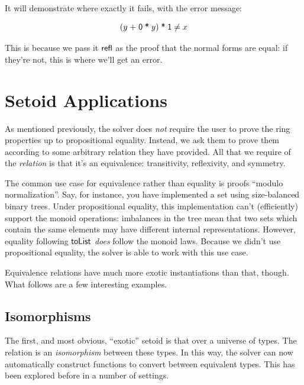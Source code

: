 \documentclass[draft, twocolumn]{article}
\theoremstyle{definition}
\theoremstyle{definition}
\begin{document}

It will demonstrate where exactly it fails, with the error message:

\[
 (y \; \AgdaFunction{+} \; \AgdaNumber{0} \; \AgdaFunction{*} \; y) \;
 \AgdaFunction{*} \;
 \AgdaNumber{1} \neq x
\]

This is because we pass it \(\AgdaField{refl}\) as the proof that the normal
forms are equal: if they're not, this is where we'll get an error.

\section{Setoid Applications} \label{equivalence}
As mentioned previously, the solver does \emph{not} require the user to prove
the ring properties up to propositional equality. Instead, we ask them to prove
them according to some arbitrary relation they have provided. All that we
require of the \emph{relation} is that it's an equivalence: transitivity,
reflexivity, and symmetry.

The common use case for equivalence rather than equality is proofs ``modulo
normalization''. Say, for instance, you have implemented a set using
size-balanced binary trees. Under propositional equality, this implementation
can't (efficiently) support the monoid operations: imbalances in the tree mean
that two sets which contain the same elements may have different internal
representations. However, equality following \(\AgdaFunction{toList}\)
\emph{does} follow the monoid laws. Because we didn't use propositional
equality, the solver is able to work with this use case.

Equivalence relations have much more exotic instantiations than that, though.
What follows are a few interesting examples.
\subsection{Isomorphisms}
The first, and most obvious, ``exotic'' setoid is that over a universe of types.
The relation is an \emph{isomorphism} between these types. In this way, the
solver can now automatically construct functions to convert between equivalent
types. This has been explored before in a number of settings.
\end{document}
